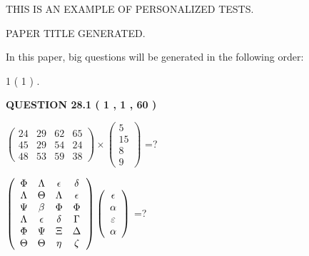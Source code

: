 \documentclass[12pt]{article}
\begin{document}
   
   
   
   
   
 \vspace{0.2in}
{\Huge  THIS IS AN EXAMPLE OF}
{\Huge  PERSONALIZED TESTS. }
   
   
 PAPER TITLE GENERATED.
   
   
   
\vspace{0.2in}
   
In this paper, big questions will be generated in the following order: 
   
   
   1 ( 1 )
 .
  
\vspace{0.2in}
  
{\textbf{\Large{QUESTION
28.1 
 ( 1 , 1 , 60 )
}}}
  
  
 
$ \left( \begin{array}{ccccccccc}
 24  & 
 29  & 
 62  & 
 65  \\ 
 45  & 
 29  & 
 54  & 
 24  \\ 
 48  & 
 53  & 
 59  & 
 38
\end{array}\right) \times
\left( \begin{array}{c}
 5  \\ 
 15  \\ 
 8  \\ 
 9
\end{array}\right) $ =?
 
 
$  %
 \left( \begin{array}
 {
 c
 c
 c
 c
 }
 \Phi & 
 \Lambda & 
 \epsilon & 
 \delta \\ 
 \Lambda & 
 \Theta & 
 \Lambda & 
 \epsilon \\ 
 \Psi & 
 \beta & 
 \Phi & 
 \Phi \\ 
 \Lambda & 
 \epsilon & 
 \delta & 
 \Gamma \\ 
 \Phi & 
 \Psi & 
                    \Xi & 
 \Delta \\ 
 \Theta & 
 \Theta & 
 \eta & 
                    \zeta
 \end{array} \right)
 \left( \begin{array}
 {
 c
 }
 \epsilon \\ 
 \alpha \\ 
 \varepsilon \\ 
 \alpha
 \end{array} \right)
$ =?
 
 
 
\noindent{}
 
\end{document}
